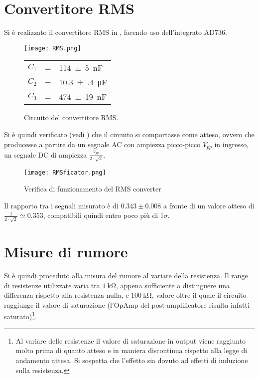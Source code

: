 \section{Convertitore RMS}
Si è realizzato il convertitore RMS in , facendo uso dell'integrato AD736.

	\begin{figure}[H]
		\begin{minipage}{0.70\textwidth}
			\centering
			\texttt{[image: RMS.png]}
			\caption{Circuito del convertitore RMS.}
			\label{fig:RMS}
		\end{minipage}
		\begin{minipage}{0.29\textwidth}
			\begin{tabular}{l@{ }c@{ }l}
				$C_{1}$& = &\SI{114(5)}{\nano\farad}\\
				$C_{2}$& = &\SI{10.3(4)}{\micro\farad}\\
				$C_3$& = &\SI{474(19)}{\nano\farad}\\
			\end{tabular}
		\end{minipage}
	\end{figure}

Si è quindi verificato (vedi ) che il circuito si comportasse come atteso, ovvero che producesse a partire da un segnale AC con ampiezza picco-picco $V_{pp}$ in ingresso, un segnale DC di ampiezza $\frac{V_{pp}}{2\cdot \sqrt{2}}$.

	\begin{figure}[H]
		\centering
		\texttt{[image: RMSficator.png]}
		\caption{Verifica di funzionamento del RMS converter}
		\label{fig:RMS_test}
	\end{figure}

Il rapporto tra i segnali misurato è di $0.343 \pm 0.008$ a fronte di un valore atteso di $\frac{1}{2\cdot\sqrt{2}} \simeq 0.353$, compatibili quindi entro poco più di $1\sigma$.

\section{Misure di rumore}
Si è quindi proceduto alla misura del rumore al variare della resistenza. Il range di resistenze utilizzate varia tra $\SI{1}{\kilo\ohm}$, appena sufficiente a distinguere una differenza rispetto alla resistenza nulla, e $\SI{100}{\kilo\ohm}$, valore oltre il quale il circuito raggiunge il valore di saturazione (l'OpAmp del post-amplificatore risulta infatti saturato)\footnote{Al variare delle resistenze il valore di saturazione in output viene raggiunto molto prima di quanto atteso e in maniera discontinua rispetto alla legge di andamento attesa. Si sospetta che l'effetto sia dovuto ad effetti di induzione sulla resistenza.}.

